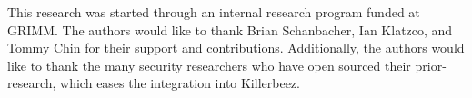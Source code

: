 This research was started through an internal research program funded at GRIMM.
The authors would like to thank Brian Schanbacher, Ian Klatzco, and Tommy Chin for their
support and contributions.  Additionally, the authors would like to thank the
many security researchers who have open sourced their prior-research, which
eases the integration into Killerbeez.
